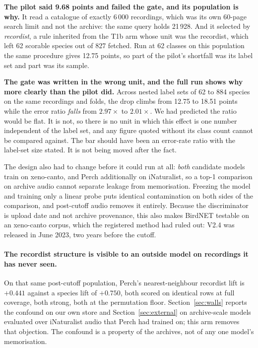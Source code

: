 \documentclass[10pt,twocolumn,a4paper]{article}
\begin{document}
\textbf{The pilot said 9.68 points and failed the gate, and its population is why.} It read a
catalogue of exactly 6\,000 recordings, which was its own 60-page search limit and not the
archive: the same query holds 21\,928. And it selected by \emph{recordist}, a rule inherited
from the T1b arm whose unit was the recordist, which left 62 scorable species out of 827
fetched. Run at 62 classes on this population the same procedure gives 12.75 points, so part of
the pilot's shortfall was its label set and part was its sample.

\textbf{The gate was written in the wrong unit, and the full run shows why more clearly than
the pilot did.} Across nested label sets of 62 to 884 species on the same recordings and folds,
the drop climbs from 12.75 to 18.51 points while the error ratio \emph{falls} from $2.97\times$
to $2.01\times$. We had predicted the ratio would be flat. It is not, so there is no unit in
which this effect is one number independent of the label set, and any figure quoted without its
class count cannot be compared against. The bar should have been an error-rate ratio with the
label-set size stated. It is not being moved after the fact.

The design also had to change before it could run at all: \emph{both} candidate models train
on xeno-canto, and Perch additionally on iNaturalist, so a top-1 comparison on archive audio
cannot separate leakage from memorisation. Freezing the model and training only a linear
probe puts identical contamination on both sides of the comparison, and post-cutoff audio
removes it entirely. Because the discriminator is upload date and not archive provenance, this
also makes BirdNET testable on an xeno-canto corpus, which the registered method had ruled
out: V2.4 was released in June 2023, two years before the cutoff.

\paragraph{The recordist structure is visible to an outside model on recordings it has never
seen.} On that same post-cutoff population, Perch's nearest-neighbour recordist lift is
$+0.441$ against a species lift of $+0.750$, both scored on identical rows at full coverage,
both strong, both at the permutation floor. Section~\ref{sec:walls} reports the confound on
our own store and Section~\ref{sec:external} on archive-scale models evaluated over
iNaturalist audio that Perch had trained on; this arm removes that objection. The confound is
a property of the archives, not of any one model's memorisation.
\end{document}
